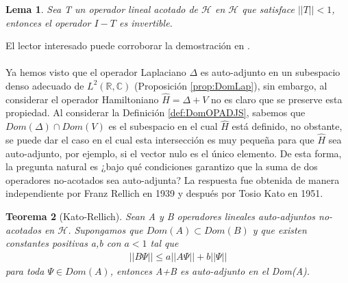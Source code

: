 \documentclass[12pt]{article}
\newtheorem{teo}{Teorema}[section]
\newtheorem{lem}[teo]{Lema}
\theoremstyle{definition}
\newcommand*{\field}[1]{\mathbb{#1}}
\begin{document}
\begin{lem}
    Sea T un operador lineal acotado de $\mathcal{H}$ en $\mathcal{H}$ que satisface $||T|| < 1$, entonces el operador $I - T$ es invertible.
    \label{lem:opinvertible}
\end{lem}
\noindent
El lector interesado puede corroborar la demostración en \cite[]{QTM}. \\ \\
Ya hemos visto que el operador Laplaciano $\Delta$ es auto-adjunto en un subespacio denso adecuado de $L^2(\field{R},\field{C})$ (Proposición \ref{prop:DomLap}), sin embargo, al considerar el operador Hamiltoniano $\hat{H} = \Delta + V$ no es claro que se preserve esta propiedad. Al considerar la Definición \ref{def:DomOPADJS}, sabemos que $Dom(\Delta)\cap Dom(V)$ es el subespacio en el cual $\hat{H}$ está definido, no obstante, se puede dar el caso en el cual esta intersección es muy pequeña para que $\hat{H}$ sea auto-adjunto, por ejemplo, si el vector nulo es el único elemento. De esta forma, la pregunta natural es ¿bajo qué condiciones garantizo que la suma de dos operadores no-acotados sea auto-adjunta? La respuesta fue obtenida de manera independiente por Franz Rellich en 1939 y después por Tosio Kato en 1951.
\begin{teo}[Kato-Rellich]
    Sean  A y B operadores lineales auto-adjuntos no-acotados en $\mathcal{H}$. Supongamos que $Dom(A)\subset Dom(B)$ y que existen constantes positivas a,b con $a<1$ tal que
    \begin{align*}
        ||B\Psi|| \leq a||A\Psi|| + b||\Psi||
    \end{align*}
    para toda $\Psi\in Dom(A)$, entonces A+B es auto-adjunto en el Dom(A).
    \label{teo:K-R}
\end{teo}
\end{document}
